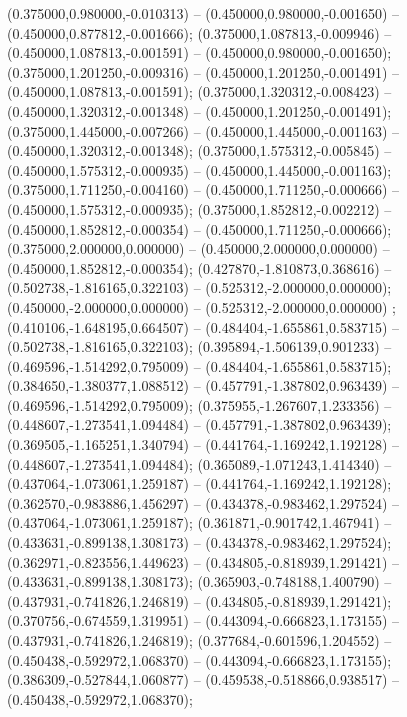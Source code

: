  (0.375000,0.980000,-0.010313) -- (0.450000,0.980000,-0.001650) -- (0.450000,0.877812,-0.001666);
 (0.375000,1.087813,-0.009946) -- (0.450000,1.087813,-0.001591) -- (0.450000,0.980000,-0.001650);
 (0.375000,1.201250,-0.009316) -- (0.450000,1.201250,-0.001491) -- (0.450000,1.087813,-0.001591);
 (0.375000,1.320312,-0.008423) -- (0.450000,1.320312,-0.001348) -- (0.450000,1.201250,-0.001491);
 (0.375000,1.445000,-0.007266) -- (0.450000,1.445000,-0.001163) -- (0.450000,1.320312,-0.001348);
 (0.375000,1.575312,-0.005845) -- (0.450000,1.575312,-0.000935) -- (0.450000,1.445000,-0.001163);
 (0.375000,1.711250,-0.004160) -- (0.450000,1.711250,-0.000666) -- (0.450000,1.575312,-0.000935);
 (0.375000,1.852812,-0.002212) -- (0.450000,1.852812,-0.000354) -- (0.450000,1.711250,-0.000666);
 (0.375000,2.000000,0.000000) -- (0.450000,2.000000,0.000000) -- (0.450000,1.852812,-0.000354);
 (0.427870,-1.810873,0.368616) -- (0.502738,-1.816165,0.322103) -- (0.525312,-2.000000,0.000000);
 (0.450000,-2.000000,0.000000) -- (0.525312,-2.000000,0.000000) ;
 (0.410106,-1.648195,0.664507) -- (0.484404,-1.655861,0.583715) -- (0.502738,-1.816165,0.322103);
 (0.395894,-1.506139,0.901233) -- (0.469596,-1.514292,0.795009) -- (0.484404,-1.655861,0.583715);
 (0.384650,-1.380377,1.088512) -- (0.457791,-1.387802,0.963439) -- (0.469596,-1.514292,0.795009);
 (0.375955,-1.267607,1.233356) -- (0.448607,-1.273541,1.094484) -- (0.457791,-1.387802,0.963439);
 (0.369505,-1.165251,1.340794) -- (0.441764,-1.169242,1.192128) -- (0.448607,-1.273541,1.094484);
 (0.365089,-1.071243,1.414340) -- (0.437064,-1.073061,1.259187) -- (0.441764,-1.169242,1.192128);
 (0.362570,-0.983886,1.456297) -- (0.434378,-0.983462,1.297524) -- (0.437064,-1.073061,1.259187);
 (0.361871,-0.901742,1.467941) -- (0.433631,-0.899138,1.308173) -- (0.434378,-0.983462,1.297524);
 (0.362971,-0.823556,1.449623) -- (0.434805,-0.818939,1.291421) -- (0.433631,-0.899138,1.308173);
 (0.365903,-0.748188,1.400790) -- (0.437931,-0.741826,1.246819) -- (0.434805,-0.818939,1.291421);
 (0.370756,-0.674559,1.319951) -- (0.443094,-0.666823,1.173155) -- (0.437931,-0.741826,1.246819);
 (0.377684,-0.601596,1.204552) -- (0.450438,-0.592972,1.068370) -- (0.443094,-0.666823,1.173155);
 (0.386309,-0.527844,1.060877) -- (0.459538,-0.518866,0.938517) -- (0.450438,-0.592972,1.068370);
